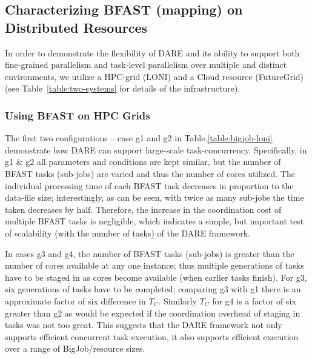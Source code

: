 \documentclass{cpeauth}
\begin{document}

\subsection{Characterizing BFAST (mapping) on Distributed Resources}

In order to demonstrate the flexibility of DARE and its ability to
support both fine-grained parallelism and task-level parallelism over
multiple and distinct environments, we utilize a HPC-grid (LONI) and a
Cloud resource (FutureGrid) (see Table~\ref{table:two-systems} for
details of the infrastructure).

\subsubsection{Using BFAST on HPC Grids}

The first two configurations -- case g1 and g2 in
Table.\ref{table:bigjob-loni} demonstrate how DARE can support
large-scale task-concurrency.  Specifically, in g1 \& g2 all
parameters and conditions are kept similar, but the number of BFAST
tasks (sub-jobs) are varied and thus the number of cores utilized.
The individual processing time of each BFAST task decreases in
proportion to the data-file size; interestingly, as can be seen, with
twice as many sub-jobs the time taken decreases by half.  Therefore,
the increase in the coordination cost of multiple BFAST tasks is
negligible, which indicates a simple, but important test of
scalability (with the number of tasks) of the DARE framework.

In cases g3 and g4, the number of BFAST tasks (sub-jobs) is greater
than the number of cores available at any one instance; thus multiple
generations of tasks have to be staged in as cores become available
(when earlier tasks finish).  For g3, six generations of tasks have to
be completed; comparing g3 with g1 there is an approximate factor of
six difference in $T_C$. Similarly $T_C$ for g4 is a factor of six
greater than g2 as would be expected if the coordination overhead of
staging in tasks was not too great. This suggests that the DARE
framework not only supports efficient concurrent task execution, it
also supports efficient execution over a range of BigJob/resource
sizes.
\end{document}
